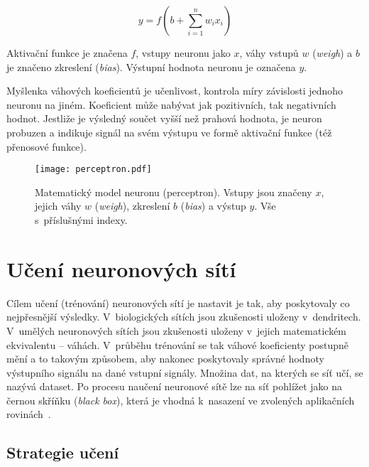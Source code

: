 \begin{equation}
    y=f(b + \sum_{i = 1}^{n} w_i x_i)
\end{equation}

Aktivační funkce je značena $f$, vstupy neuronu jako $x$, váhy vstupů $w$ (\textit{weigh}) a $b$ je značeno zkreslení (\textit{bias}). Výstupní hodnota neuronu je označena $y$.

Myšlenka váhových koeficientů je učenlivost, kontrola míry závislosti jednoho neuronu na jiném. Koeficient může nabývat jak pozitivních, tak negativních hodnot. Jestliže je výsledný součet vyšší než prahová hodnota, je neuron probuzen a indikuje signál na svém výstupu ve formě aktivační funkce (též přenosové funkce).

\begin{figure}[H]
    \centering
    \texttt{[image: perceptron.pdf]}
    \caption[Matematický model neuronu (perceptron)]{Matematický model neuronu (perceptron). Vstupy jsou značeny $x$, jejich váhy $w$ (\textit{weigh}), zkreslení $b$ (\textit{bias}) a výstup $y$. Vše s~příslušnými indexy.}
    \label{fig_perceptron}
\end{figure}


\section{Učení neuronových sítí}
\label{sec_training_neural_network}

Cílem učení (trénování) neuronových sítí je nastavit je tak, aby poskytovaly co nejpřesnější výsledky. V~biologických sítích jsou zkušenosti uloženy v~dendritech. V~umělých neuronových sítích jsou zkušenosti uloženy v~jejich matematickém ekvivalentu -- váhách. V~průběhu trénování se tak váhové koeficienty postupně mění a to takovým způsobem, aby nakonec poskytovaly správné hodnoty výstupního signálu na dané vstupní signály. Množina dat, na kterých se síť učí, se nazývá dataset. Po procesu naučení neuronové sítě lze na síť pohlížet jako na černou skříňku (\textit{black box}), která je vhodná k~nasazení ve zvolených aplikačních rovinách~\cite{mendeluNeuralNetworks}.


\subsection*{Strategie učení}

